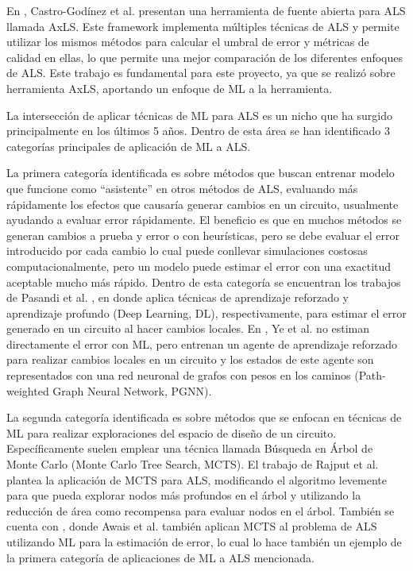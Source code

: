 En \cite{castro-godinez_axls_2021}, Castro-Godínez et al. presentan una
herramienta de fuente abierta para ALS llamada AxLS. Este framework implementa
múltiples técnicas de ALS y permite utilizar los mismos métodos para calcular
el umbral de error y métricas de calidad en ellas, lo que permite una mejor
comparación de los diferentes enfoques de ALS. Este trabajo es fundamental para
este proyecto, ya que se realizó sobre herramienta AxLS, aportando un
enfoque de ML a la herramienta.

La intersección de aplicar técnicas de ML para ALS es un nicho que ha surgido
principalmente en los últimos 5 años. Dentro de esta área se han identificado 3
categorías principales de aplicación de ML a ALS.

La primera categoría identificada es sobre métodos que buscan entrenar modelo
que funcione como ``asistente'' en otros métodos de ALS, evaluando más
rápidamente los efectos que causaría generar cambios en un circuito, usualmente
ayudando a evaluar error rápidamente. El beneficio es que en muchos métodos se
generan cambios a prueba y error o con heurísticas, pero se debe evaluar el
error introducido por cada cambio lo cual puede conllevar simulaciones costosas
computacionalmente, pero un modelo puede estimar el error con una exactitud
aceptable mucho más rápido. Dentro de esta categoría se encuentran los trabajos
de Pasandi et al. \cite{pasandi_approximate_2019}
\cite{pasandi_deep-powerx_2020}, en donde aplica técnicas de aprendizaje
reforzado y aprendizaje profundo (Deep Learning, DL),
respectivamente, para estimar el error generado en un circuito al hacer cambios
locales. En \cite{ye_timing-driven_2024}, Ye et al. no estiman directamente el
error con ML, pero entrenan un agente de aprendizaje reforzado para realizar
cambios locales en un circuito y los estados de este agente son representados
con una red neuronal de grafos con pesos en los caminos (Path-weighted Graph
Neural Network, PGNN).

La segunda categoría identificada es sobre métodos que se enfocan en técnicas
de ML para realizar exploraciones del espacio de diseño de un circuito.
Específicamente suelen emplear una técnica llamada Búsqueda en Árbol de Monte
Carlo (Monte Carlo Tree Search, MCTS). El trabajo de Rajput et al.
\cite{rajput_improved_2023} plantea la aplicación de MCTS para ALS, modificando
el algoritmo levemente para que pueda explorar nodos más profundos en el árbol
y utilizando la reducción de área como recompensa para evaluar nodos en el
árbol. También se cuenta con \cite{awais_deepapprox_2024}, donde Awais et al.
también aplican MCTS al problema de ALS utilizando ML para la estimación de
error, lo cual lo hace también un ejemplo de la primera categoría de
aplicaciones de ML a ALS mencionada.

